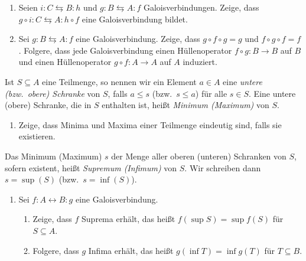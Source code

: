 \documentclass{latex-uebungsblatt/uebungsblatt}
\begin{document}
\begin{exercise}[Galoisverbindungen]
\begin{enumerate}
      \begin{equation*}
        \begin{tikzcd}
          (𝒫(K[x_1,\dots,x_n]),⊇)
            \arrow[r,yshift=-2.5,"𝒱"']
          & (𝒫(𝔸^n_K),⊆)
            \arrow[l,yshift=2.5,"ℐ"']
        \end{tikzcd}
      \end{equation*}
    \item Seien
      $
        i:C ⇆ B:h$ und $g:B ⇆ A:f
        $
        Galoisverbindungen.
      Zeige, dass
      $
        g∘i:C ⇆ A:h∘f
        $
        eine Galoisverbindung bildet.
    \item Sei $g:B⇆A:f$ eine Galoisverbindung.
      Zeige, dass $g∘f∘g=g$ und $f∘g∘f=f$.
      Folgere, dass jede Galoisverbindung einen Hüllenoperator $f∘g:B → B$ auf $B$ und einen Hüllenoperator $g∘f:A → A$ auf $A$ induziert.
  \end{enumerate}
\end{exercise}

  
  Ist $S⊆A$ eine Teilmenge, so nennen wir ein Element $a ∈ A$ eine \emph{untere (bzw.~obere) Schranke} von $S$, falls $a ≤ s$ (bzw.~$s ≤ a$) für alle $s ∈ S$.
    Eine untere (obere) Schranke, die in $S$ enthalten ist, heißt \emph{Minimum (Maximum)} von $S$.
  \begin{enumerate}
    \item Zeige, dass Minima und Maxima einer Teilmenge eindeutig sind, falls sie existieren.
  \end{enumerate}
  Das Minimum (Maximum) $s$ der Menge aller oberen (unteren) Schranken von $S$, sofern existent, heißt \emph{Supremum (Infimum)} von $S$.
  Wir schreiben dann $s=\sup(S)$ (bzw.~$s=\inf(S)$).
  \begin{enumerate}[start=2]
    \item Sei $f:A ↔ B:g$ eine Galoisverbindung.
      \begin{enumerate}
        \item Zeige, dass $f$ Suprema erhält, das heißt $f(\sup S)=\sup f(S)$ für $S⊆A$.
        \item Folgere, dass $g$ Infima erhält, das heißt $g(\inf T)=\inf g(T)$ für $T⊆B$.
      \end{enumerate}
  \end{enumerate}
\end{document}
